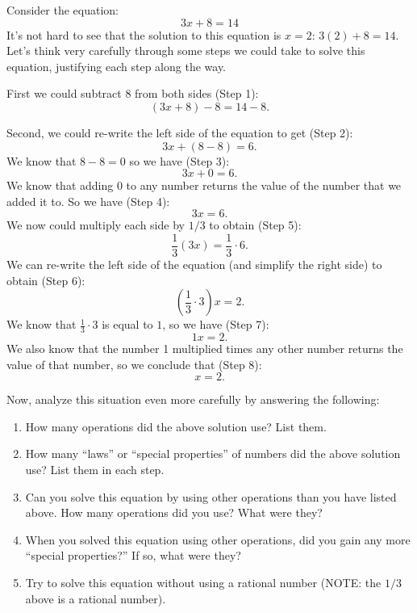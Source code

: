\documentclass[11pt]{article}
\newenvironment{task}
	{\begin{mdframed}[linecolor=lightgray, linewidth=3pt]\raggedright}
	{\end{mdframed}}
\theoremstyle{definition}
\begin{document}
\begin{task}
  Consider the equation:
\[ 3x + 8 = 14 \]
It's not hard to see that the solution to this equation is $x=2$: $3(2)+8 = 14$. Let's think very carefully through some steps we 
could take to solve this equation, justifying each step along the way. 

First we could subtract $8$ from both sides (Step 1):
\[ (3x+8)-8 = 14 -8.\]

Second, we could re-write the left side of the equation to get (Step 2):
\[ 3x + (8-8) = 6.\]
We know that $8-8=0$ so we have (Step 3):
\[ 3x + 0 = 6.\]
We know that adding 0 to any number returns the value of the number that we added it to. So we have (Step 4):
\[ 3x = 6.\]
We now could multiply each side by $1/3$ to obtain (Step 5):
\[ \frac{1}{3}(3x) = \frac{1}{3}\cdot 6. \]
We can re-write the left side of the equation (and simplify the right side) to obtain (Step 6):
\[ \left( \frac{1}{3}\cdot 3 \right)x = 2. \]
We know that $\frac{1}{3}\cdot 3$ is equal to $1$, so we have (Step 7):
\[ 1x = 2.\]
We also know that the number 1 multiplied times any other number returns the value of that number, so we conclude that (Step 8):
\[ x = 2.\]

Now, analyze this situation even more carefully by answering the following:
\begin{enumerate}
  \item How many operations did the above solution use? List them.
  \item How many ``laws'' or ``special properties'' of numbers did the above solution use? List them in each step. 
  
  \item Can you solve this equation by using other operations than you have listed above. How many operations did you use? What were they? 
  \item When you solved this equation using other operations, did you gain any more ``special properties?'' If so, what were they?
  \item Try to solve this equation without using a rational number (NOTE: the $1/3$ above is a rational number).
\end{enumerate}
\end{task}
\end{document}
